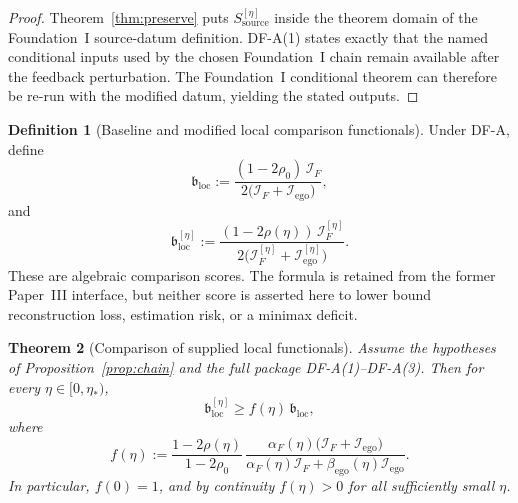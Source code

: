\documentclass[12pt]{article}
\newtheorem{theorem}{Theorem}[section]
\theoremstyle{definition}
\newtheorem{definition}[theorem]{Definition}
\theoremstyle{remark}
\begin{document}
\begin{proof}
Theorem~\ref{thm:preserve} puts
\(S_{\mathrm{source}}^{[\eta]}\) inside the theorem domain of the
Foundation~I source-datum definition. DF-A(1) states exactly that the
named conditional inputs used by the chosen Foundation~I chain remain
available after the feedback perturbation. The Foundation~I conditional
theorem can therefore be re-run with the modified datum, yielding the
stated outputs.
\end{proof}

\begin{definition}[Baseline and modified local comparison functionals]
\label{def:floor}
Under DF-A, define
\[
\mathfrak b_{\mathrm{loc}}
:=
\frac{(1-2\rho_0)\,\mathcal I_F}
{2\bigl(\mathcal I_F+\mathcal I_{\mathrm{ego}}\bigr)},
\]
and
\[
\mathfrak b_{\mathrm{loc}}^{[\eta]}
:=
\frac{(1-2\rho(\eta))\,\mathcal I_F^{[\eta]}}
{2\bigl(\mathcal I_F^{[\eta]}+\mathcal I_{\mathrm{ego}}^{[\eta]}\bigr)}.
\]
These are algebraic comparison scores. The formula is retained from the
former Paper~III interface, but neither score is asserted here to lower
bound reconstruction loss, estimation risk, or a minimax deficit.
\end{definition}

\begin{theorem}[Comparison of supplied local functionals]\label{thm:deficit}
Assume the hypotheses of Proposition~\ref{prop:chain} and the full
package DF-A(1)--DF-A(3). Then for every \(\eta\in[0,\eta_*)\),
\[
\mathfrak b_{\mathrm{loc}}^{[\eta]}
\ge
f(\eta)\,
\mathfrak b_{\mathrm{loc}},
\]
where
\[
f(\eta)
:=
\frac{1-2\rho(\eta)}{1-2\rho_0}\,
\frac{\alpha_F(\eta)
\bigl(\mathcal I_F+\mathcal I_{\mathrm{ego}}\bigr)}
{\alpha_F(\eta)\mathcal I_F
+\beta_{\mathrm{ego}}(\eta)\mathcal I_{\mathrm{ego}}}.
\]
In particular, \(f(0)=1\), and by continuity \(f(\eta)>0\) for all
sufficiently small \(\eta\).
\end{theorem}
\end{document}
